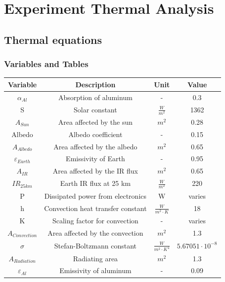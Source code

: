 \newpage
\section{Experiment Thermal Analysis} \label{sec:appI}
\subsection{Thermal equations}

\subsubsection{Variables and Tables}
\begin{table}[H]
    \centering
    \begin{tabular}{|c|c|c|c|}
        \hline
        \textbf{Variable} & \textbf{Description} & \textbf{Unit} & \textbf{Value} \\ \hline
        $\alpha_{Al}$ & Absorption of aluminum & - & 0.3 \\ \hline
        S & Solar constant & $\frac{W}{m^2}$ & 1362 \\ \hline
        $A_{Sun}$ & Area affected by the sun & $m^2$ & 0.28 \\ \hline
        Albedo & Albedo coefficient & - & 0.15 \\ \hline
        $A_{Albedo}$ & Area affected by the albedo & $m^2$ & 0.65 \\ \hline
        $\varepsilon_{Earth}$ & Emissivity of Earth & - & 0.95 \\ \hline
        $A_{IR}$ & Area affected by the IR flux & $m^2$ & 0.65 \\ \hline
        $IR_{25km}$ & Earth IR flux at 25 km & $\frac{W}{m^2}$ & 220 \\ \hline
        P & Dissipated power from electronics & W & varies \\ \hline
        h & Convection heat transfer constant & $\frac{W}{m^2 \cdot K}$ & 18 \\ \hline
        K & Scaling factor for convection & - & varies \\ \hline
        $A_{Convection}$ & Area affected by the convection & $m^2$ & 1.3 \\ \hline
        $\sigma$ & Stefan-Boltzmann constant & $\frac{W}{m^2 \cdot K^4}$ & $5.67051 \cdot 10^{-8}$ \\ \hline
        $A_{Radiation}$ & Radiating area & $m^2$ & 1.3\\ \hline
        $\varepsilon_{Al}$ & Emissivity of aluminum & - & 0.09 \\ \hline

\end{tabular}
\end{table}
